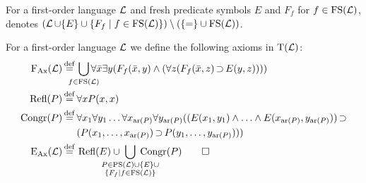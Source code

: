 \begin{defi}
	For a first-order language $\operatorname{\mathcal{L}}$ and fresh predicate symbols $E$ and $F_f$ for $f\in \operatorname{FS}(\operatorname{\mathcal{L}})$, 
	 denotes $(\LangSym \cup \{E\}\cup\{F_f\mid f \in\nolinebreak \FS(\LangSym)\}) \setminus\allowbreak (\{=\nolinebreak \} \cup\nolinebreak \FS(\LangSym))$.
\end{defi}

\begin{defi}
	For a first-order language $\operatorname{\mathcal{L}}$ we define the following axioms in $\operatorname{T}(\operatorname{\mathcal{L}})$:\nopagebreak
	\begin{align*}
		\FAX(\LangSym) \defeq{}& \smashoperator{\bigcup_{f \in \FS(\LangSym)}}  \forall \bar x \exists y (F_f(\bar x, y) \land (\forall z (F_f(\bar x, z) \limpl E(y, z)))) \\
		\Refl(P) \defeq{}& \forall x P(x,x)  \\ 
		\Congr(P) \defeq{}& 
\forall x_1 \forall y_1 \ldots \forall x_{\ar(P)} \forall y_{\ar(P)} 
(( E(x_1,y_1) \land \ldots \land E(x_{\ar(P)},  y_{\ar(P)})) \limpl  \\
 & (P(x_1, \ldots, x_{\ar(P)}) \limpl P(y_1, \ldots, y_{\ar(P)}) )) \\
		\EAX(\LangSym) \defeq{}& \Refl(E) \cup \;\smashoperator{\bigcup_{\substack{P \in\PS(\LangSym)\cup\{E\}\cup\\ \{F_f\mid f\in \FS(\LangSym)\}}}}\; \Congr(P)
\qedhere
\end{align*}
\end{defi}

